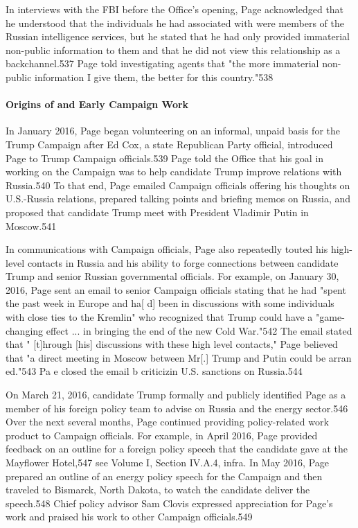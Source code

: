 In interviews with the FBI before the Office's opening, Page acknowledged that he understood that the individuals he had associated with were members of the Russian intelligence services, but he stated that he had only provided immaterial non-public information to them and that he did not view this relationship as a backchannel.537 Page told investigating agents that "the more immaterial non-public information I give them, the better for this country."538

\paragraph{Origins of and Early Campaign Work}

In January 2016, Page began volunteering on an informal, unpaid basis for the Trump Campaign after Ed Cox, a  state Republican Party official,  introduced Page to Trump Campaign officials.539 Page told the Office that his goal in working on the Campaign was to help candidate Trump improve relations with Russia.540 To that end, Page emailed Campaign officials offering his thoughts on U.S.-Russia relations, prepared talking points and briefing memos on Russia, and proposed that candidate Trump meet with President Vladimir Putin in Moscow.541

In communications with Campaign officials, Page also repeatedly touted his high-level contacts in Russia and his ability to forge connections between candidate Trump and senior Russian governmental officials. For example, on January 30, 2016, Page sent an email to senior Campaign officials stating that he had "spent the past week in Europe and ha[ d] been in discussions with some individuals with close ties to the Kremlin" who recognized that Trump could have a "game-changing effect ... in bringing the end of the new Cold War."542 The email stated that " [t]hrough [his] discussions with these high level contacts,"  Page believed that "a direct meeting in Moscow between Mr[.] Trump and Putin could be arran ed."543 Pa e  closed the email b criticizin U.S. sanctions on Russia.544

On March 21, 2016, candidate Trump formally and publicly identified Page as a member of his foreign policy team to advise on Russia and the energy sector.546 Over the next several months,  Page continued providing policy-related work product  to Campaign officials. For example, in April 2016, Page provided feedback on an outline for a foreign policy speech that the candidate gave at the Mayflower Hotel,547 see Volume I, Section IV.A.4, infra. In May 2016, Page prepared an outline of an energy policy speech for the Campaign and then traveled to Bismarck, North Dakota, to watch the candidate deliver the speech.548 Chief policy advisor Sam Clovis expressed appreciation for Page's work and praised his work to other Campaign officials.549

